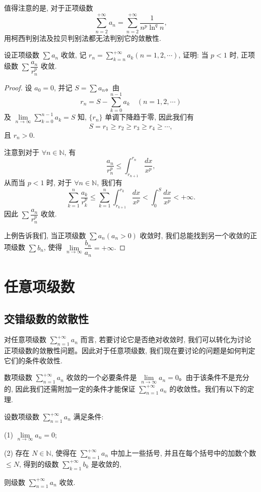 值得注意的是, 对于正项级数
\[
  \sum_{n=2}^{+\infty}a_n=\sum_{n=2}^{+\infty}\frac1{n^p\ln^q n},
\]
用柯西判别法及拉贝判别法都无法判别它的敛散性.

\begin{example}\label{example:ma-9-2-10}
设正项级数 $\sum a_n$ 收敛, 记 $r_n=\sum\limits_{k=n}^{+\infty}a_k(n=1,2,\cdots)$, 证明: 当 $p<1$ 时, 正项级数 $\sum\dfrac{a_n}{r_n^p}$ 收敛.
\end{example}


\begin{proof}
设 $a_0=0$, 并记 $S=\sum a_n$。由
\[
  r_n=S-\sum_{k=0}^{n-1}a_k\quad(n=1,2,\cdots)
\]
及 $\lim\limits_{n\to\infty}\sum\limits_{k=0}^{n-1}a_k=S$ 知, $\{r_n\}$ 单调下降趋于零, 因此我们有
\[
  S=r_1\geq r_2\geq r_3\geq r_4\geq\cdots,
\]
且 $r_n>0$.

注意到对于 $\forall n\in\mathbb{N}$, 有
\[
  \frac{a_n}{r_n^p}\leq\int_{r_{n+1}}^{r_n}\frac{dx}{x^p},
\]
从而当 $p<1$ 时, 对于 $\forall n\in\mathbb{N}$, 我们有
\[
  \sum_{k=1}^n\frac{a_k}{r_k^p}
  \leq\sum_{k=1}^n\int_{r_{k+1}}^{r_k}\frac{dx}{x^p}
  <\int_0^S\frac{dx}{x^p}<+\infty.
\]
因此 $\sum\dfrac{a_n}{r_n^p}$ 收敛.

上例告诉我们, 当正项级数 $\sum a_n(a_n>0)$ 收敛时, 我们总能找到另一个收敛的正项级数 $\sum b_n$, 使得 $\lim\limits_{n\to\infty}\dfrac{b_n}{a_n}=+\infty$.
\end{proof}


\section{任意项级数}
\label{sec:ma-9-3}

\subsection{交错级数的敛散性}
\label{subsec:ma-9-3-1}

对任意项级数 $\sum\limits_{n=1}^{+\infty}a_n$ 而言, 若要讨论它是否绝对收敛时, 我们可以转化为讨论正项级数的敛散性问题。因此对于任意项级数, 我们现在要讨论的问题是如何判定它们的条件收敛性.

数项级数 $\sum\limits_{n=1}^{+\infty}a_n$ 收敛的一个必要条件是 $\lim\limits_{n\to\infty}a_n=0$。由于该条件不是充分的, 因此我们还需附加一定的条件才能保证 $\sum\limits_{n=1}^{+\infty}a_n$ 的收敛性。我们有以下的定理.

\begin{theorem}\label{theorem:ma-9-3-1}
设数项级数 $\sum\limits_{n=1}^{+\infty}a_n$ 满足条件:

(1) $\lim\limits_{n\to\infty}a_n=0$;

(2) 存在 $N\in\mathbb{N}$, 使得在 $\sum\limits_{n=1}^{+\infty}a_n$ 中加上一些括号, 并且在每个括号中的加数个数 $\leq N$, 得到的级数 $\sum\limits_{k=1}^{+\infty}b_k$ 是收敛的,

则级数 $\sum\limits_{n=1}^{+\infty}a_n$ 收敛.
\end{theorem}


